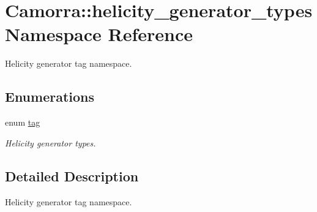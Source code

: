 \hypertarget{a00805}{
\section{Camorra::helicity\_\-generator\_\-types Namespace Reference}
\label{a00805}
}


Helicity generator tag namespace.  


\subsection*{Enumerations}
\begin{DoxyCompactItemize}
\item 
enum \hyperlink{a00805_a62ceaf871e3c559e98270a98c9a3a95d}{tag} 
\begin{DoxyCompactList}\small\item\em Helicity generator types. \end{DoxyCompactList}\end{DoxyCompactItemize}


\subsection{Detailed Description}
Helicity generator tag namespace. 